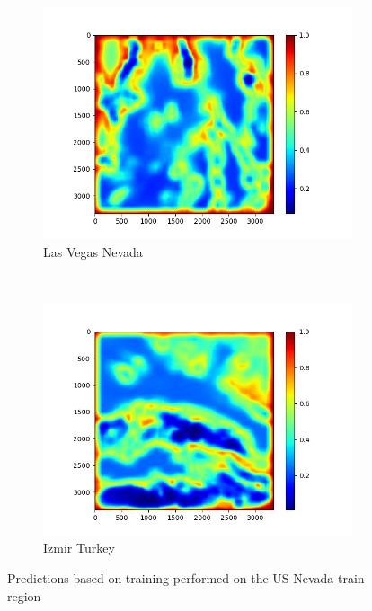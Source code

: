 \documentclass[11pt,a4paper]{article}
\begin{document}
\begin{figure}[t]
    \begin{subfigure}[b]{0.45\textwidth}
        \includegraphics[width=\textwidth]{graphics/training/train_on_6_features_01234/heatmaps_faults_4.png}
        \caption{Las Vegas Nevada}
        \label{fig:heatmaps_3_Las_Vegas_Nevada}
    \end{subfigure}
    ~
    \begin{subfigure}[b]{0.45\textwidth}
        \includegraphics[width=\textwidth]{graphics/training/train_on_6_features_01234/heatmaps_faults_5.png}
        \caption{Izmir Turkey}
        \label{fig:heatmaps_3_Izmir_Turkey}
    \end{subfigure}
    \caption{Predictions based on training performed on the US Nevada train region}
    \label{fig:train_on_6_features_01234_no_additional_im}
\end{figure}
\end{document}

